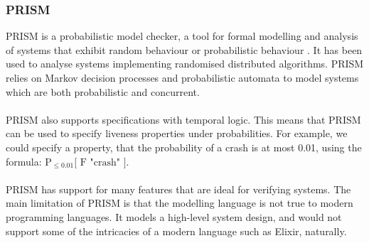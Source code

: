 \subsubsection*{\textbf{PRISM}}
PRISM is a probabilistic model checker, a tool for formal modelling and analysis of systems that exhibit random behaviour or probabilistic behaviour \cite{prism}. It has been used to analyse systems implementing randomised distributed algorithms. PRISM relies on Markov decision processes and probabilistic automata to model systems which are both probabilistic and concurrent.
\\ \\
PRISM also supports specifications with temporal logic. This means that PRISM can be used to specify liveness properties under probabilities. For example, we could specify a property, that the probability of a crash is at most 0.01, using the formula: $\text{P}_{\leq 0.01} \text{[ F "crash" ]}$.
\\ \\
PRISM has support for many features that are ideal for verifying systems. The main limitation of PRISM is that the modelling language is not true to modern programming languages. It models a high-level system design, and would not support some of the intricacies of a modern language such as Elixir, naturally.
